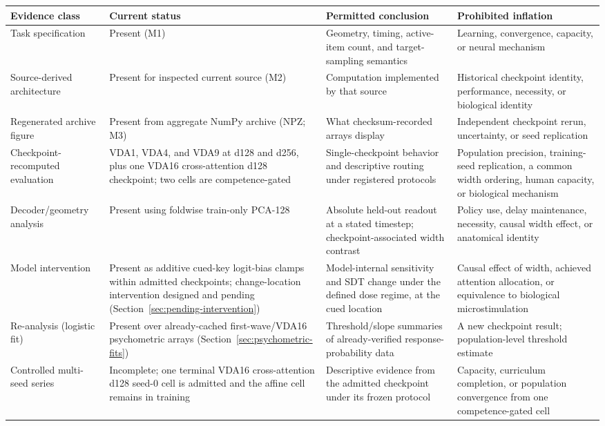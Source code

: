 \documentclass[11pt,a4paper]{article}
\begin{document}
\begingroup\small
\begin{tabularx}{\textwidth}{@{}p{3.5cm}p{2.7cm}Y Y@{}}
\toprule
\textbf{Evidence class} & \textbf{Current status} & \textbf{Permitted conclusion} & \textbf{Prohibited inflation}\\
\midrule
Task specification & Present (M1) & Geometry, timing, active-item count, and target-sampling semantics & Learning, convergence, capacity, or neural mechanism\\
Source-derived architecture & Present for inspected current source (M2) & Computation implemented by that source & Historical checkpoint identity, performance, necessity, or biological identity\\
Regenerated archive figure & Present from aggregate NumPy archive (NPZ; M3) & What checksum-recorded arrays display & Independent checkpoint rerun, uncertainty, or seed replication\\
Checkpoint-recomputed evaluation & VDA1, VDA4, and VDA9 at d128 and d256, plus one VDA16 cross-attention d128 checkpoint; two cells are competence-gated & Single-checkpoint behavior and descriptive routing under registered protocols & Population precision, training-seed replication, a common width ordering, human capacity, or biological mechanism\\
Decoder/geometry analysis & Present using foldwise train-only PCA-128 & Absolute held-out readout at a stated timestep; checkpoint-associated width contrast & Policy use, delay maintenance, necessity, causal width effect, or anatomical identity\\
Model intervention & Present as additive cued-key logit-bias clamps within admitted checkpoints; change-location intervention designed and pending (Section~\ref{sec:pending-intervention}) & Model-internal sensitivity and SDT change under the defined dose regime, at the cued location & Causal effect of width, achieved attention allocation, or equivalence to biological microstimulation\\
Re-analysis (logistic fit) & Present over already-cached first-wave/VDA16 psychometric arrays (Section~\ref{sec:psychometric-fits}) & Threshold/slope summaries of already-verified response-probability data & A new checkpoint result; population-level threshold estimate\\
Controlled multi-seed series & Incomplete; one terminal VDA16 cross-attention d128 seed-0 cell is admitted and the affine cell remains in training & Descriptive evidence from the admitted checkpoint under its frozen protocol & Capacity, curriculum completion, or population convergence from one competence-gated cell\\
\bottomrule
\end{tabularx}
\endgroup
\end{document}
